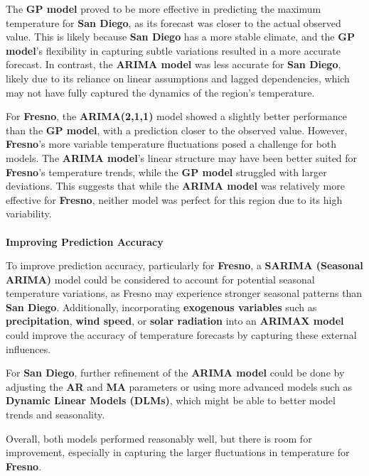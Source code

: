 \documentclass[
  11pt,
]{article}
\makeatletter
\let\oldparagraph\paragraph
\renewcommand{\paragraph}{
    \@ifstar
      \xxxParagraphStar
      \xxxParagraphNoStar
  }
\newcommand{\xxxParagraphStar}[1]{\oldparagraph*{#1}\mbox{}}
\newcommand{\xxxParagraphNoStar}[1]{\oldparagraph{#1}\mbox{}}
\makeatother
\begin{document}
The \textbf{GP model} proved to be more effective in predicting the
maximum temperature for \textbf{San Diego}, as its forecast was closer
to the actual observed value. This is likely because \textbf{San Diego}
has a more stable climate, and the \textbf{GP model}'s flexibility in
capturing subtle variations resulted in a more accurate forecast. In
contrast, the \textbf{ARIMA model} was less accurate for \textbf{San
Diego}, likely due to its reliance on linear assumptions and lagged
dependencies, which may not have fully captured the dynamics of the
region's temperature.

For \textbf{Fresno}, the \textbf{ARIMA(2,1,1)} model showed a slightly
better performance than the \textbf{GP model}, with a prediction closer
to the observed value. However, \textbf{Fresno}'s more variable
temperature fluctuations posed a challenge for both models. The
\textbf{ARIMA model}'s linear structure may have been better suited for
\textbf{Fresno}'s temperature trends, while the \textbf{GP model}
struggled with larger deviations. This suggests that while the
\textbf{ARIMA model} was relatively more effective for \textbf{Fresno},
neither model was perfect for this region due to its high variability.

\paragraph{\texorpdfstring{\textbf{Improving Prediction
Accuracy}}{Improving Prediction Accuracy}}\label{improving-prediction-accuracy}

To improve prediction accuracy, particularly for \textbf{Fresno}, a
\textbf{SARIMA (Seasonal ARIMA)} model could be considered to account
for potential seasonal temperature variations, as Fresno may experience
stronger seasonal patterns than \textbf{San Diego}. Additionally,
incorporating \textbf{exogenous variables} such as
\textbf{precipitation}, \textbf{wind speed}, or \textbf{solar radiation}
into an \textbf{ARIMAX model} could improve the accuracy of temperature
forecasts by capturing these external influences.

For \textbf{San Diego}, further refinement of the \textbf{ARIMA model}
could be done by adjusting the \textbf{AR} and \textbf{MA} parameters or
using more advanced models such as \textbf{Dynamic Linear Models
(DLMs)}, which might be able to better model trends and seasonality.

Overall, both models performed reasonably well, but there is room for
improvement, especially in capturing the larger fluctuations in
temperature for \textbf{Fresno}.
\end{document}
